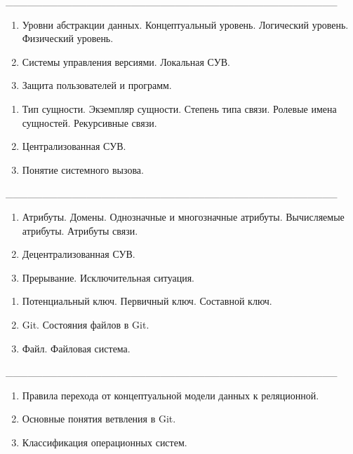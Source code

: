 \documentclass[oneside, final, 14pt]{extreport}
\newcommand{\cutline}{\_\_\_\_\_\_\_\_\_\_\_\_\_\_\_\_\_\_\_\_\_\_\_\_\_\_\_\_\_\_\_\_\_\_\_\_\_\_\_\_\_\_\_\_\_}
\begin{document}
\cutline


\begin{enumerate}
\item Уровни абстракции данных. Концептуальный уровень. Логический уровень. Физический уровень.
\item Системы управления версиями. Локальная СУВ.
\item Защита пользователей и программ. 
\end{enumerate}


\newpage


\begin{enumerate}
\item Тип сущности. Экземпляр сущности. Степень типа связи. Ролевые имена сущностей. Рекурсивные связи.
\item Централизованная СУВ.
\item Понятие системного вызова.
\end{enumerate}


\cutline


\begin{enumerate}
\item Атрибуты. Домены. Однозначные и многозначные атрибуты. Вычисляемые атрибуты. Атрибуты связи.
\item Децентрализованная СУВ.
\item Прерывание. Исключительная ситуация.
\end{enumerate}


\newpage


\begin{enumerate}
\item Потенциальный ключ. Первичный ключ. Составной ключ.
\item Git. Состояния файлов в Git.
\item Файл. Файловая система.
\end{enumerate}


\cutline


\begin{enumerate}
\item Правила перехода от концептуальной модели данных к реляционной.
\item Основные понятия ветвления в Git.
\item Классификация операционных систем.
\end{enumerate}

\end{document}
